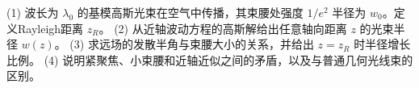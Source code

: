 (1) 波长为 \(\lambda_0\) 的基模高斯光束在空气中传播，其束腰处强度 \(1/e^2\) 半径为 \(w_0\)。定义Rayleigh距离 \(z_R\)。
(2) 从近轴波动方程的高斯解给出任意轴向距离 \(z\) 的光束半径 \(w(z)\)。
(3) 求远场的发散半角与束腰大小的关系，并给出 \(z=z_R\) 时半径增长比例。
(4) 说明紧聚焦、小束腰和近轴近似之间的矛盾，以及与普通几何光线束的区别。
